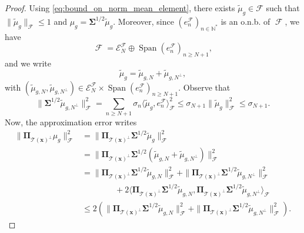 \documentclass[twoside,11pt]{book}
\numberwithin{theorem}{chapter}
\numberwithin{definition}{chapter}
\numberwithin{proposition}{chapter}
\numberwithin{corollary}{chapter}
\numberwithin{example}{chapter}
\numberwithin{lemma}{chapter}
\numberwithin{assumption}{chapter}
\DeclareMathOperator{\Span}{\mathrm{Span}}
\DeclareMathOperator{\F}{\mathcal{F}}
\begin{document}
\begin{proof}
Using \eqref{eq:bound_on_norm_mean_element}, there exists $\tilde{\mu}_{g} \in \mathcal{F}$ such that $\|\tilde{\mu}_{g}\|_{\mathcal{F}} \leq 1$ and $\mu_{g} = \bm{\Sigma}^{1/2}\tilde{\mu}_{g}$. Moreover,
since $(e_{n}^{\F})_{n \in \mathbb{N}^{*}}$ is an o.n.b. of $\F$, we have
\begin{equation}
\F = \mathcal{E}_{N}^{\F} \oplus \Span (e_{n}^{\F})_{n \geq N+1},
\end{equation}
and we write
\begin{equation}
\tilde{\mu}_{g} = \tilde{\mu}_{g,N} + \tilde{\mu}_{g,N^{\perp}},
\end{equation}
with $(\tilde{\mu}_{g,N}, \tilde{\mu}_{g,N^{\perp}}) \in \mathcal{E}_{N}^{\F} \times \Span (e_{n}^{\F})_{n \geq N+1}$. Observe that
\begin{equation}\label{eq:sup_sigma_N}
  \|\bm{\Sigma}^{1/2} \tilde{\mu}_{g,N^{\perp}}\|_{\mathcal{F}}^{2} = \sum\limits_{n \geq N+1} \sigma_{n} \langle \tilde{\mu}_{g},e_{n}^{\F} \rangle_{\F}^{2}  \leq \sigma_{N+1} \|\tilde{\mu}_{g}\|_{\F}^{2} \leq \sigma_{N+1}.
\end{equation}
 Now, the approximation error writes
\begin{align}
  \|\bm{\Pi}_{\mathcal{T}(\bm{x})^{\perp}}\mu_{g}\|^{2}_{\mathcal{F}}& = \| \bm{\Pi}_{\mathcal{T}(\bm{x})^{\perp}}\bm{\Sigma}^{1/2} \tilde{\mu}_{g}\| _{\mathcal{F}}^{2}\\
  & = \| \bm{\Pi}_{\mathcal{T}(\bm{x})^{\perp}}\bm{\Sigma}^{1/2}(\tilde{\mu}_{g,N} + \tilde{\mu}_{g,N^{\perp}}) \| _{\mathcal{F}}^{2} \nonumber\\
  & = \| \bm{\Pi}_{\mathcal{T}(\bm{x})^{\perp}}\bm{\Sigma}^{1/2} \tilde{\mu}_{g,N}\|_{\mathcal{F}}^{2} + \| \bm{\Pi}_{\mathcal{T}(\bm{x})^{\perp}}\bm{\Sigma}^{1/2} \tilde{\mu}_{g,N^{\perp}}\| _{\mathcal{F}}^{2} \\
  & \qquad\qquad + 2 \langle \bm{\Pi}_{\mathcal{T}(\bm{x})^{\perp}}\bm{\Sigma}^{1/2} \tilde{\mu}_{g,N}, \bm{\Pi}_{\mathcal{T}(\bm{x})^{\perp}}\bm{\Sigma}^{1/2} \tilde{\mu}_{g,N^{\perp}}\rangle_{\mathcal{F}} \nonumber\\
  & \leq 2 \left(\| \bm{\Pi}_{\mathcal{T}(\bm{x})^{\perp}}\bm{\Sigma}^{1/2}\tilde{\mu}_{g,N}\| _{\mathcal{F}}^{2} + \| \bm{\Pi}_{\mathcal{T}(\bm{x})^{\perp}}\bm{\Sigma}^{1/2} \tilde{\mu}_{g,N^{\perp}}\| _{\mathcal{F}}^{2}\right) \nonumber.
\end{align}

\end{proof}
\end{document}
